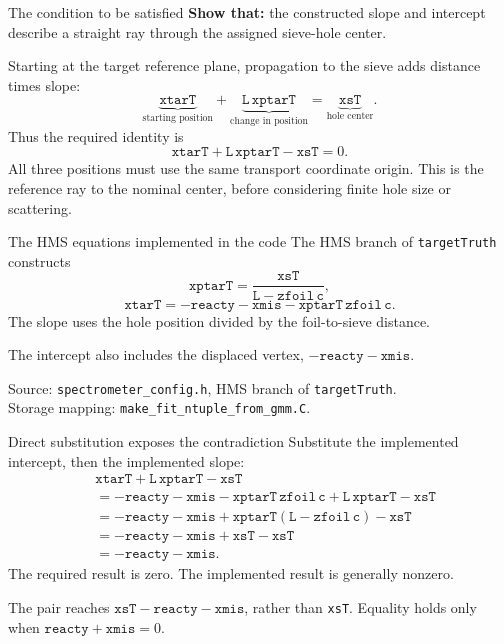 \documentclass[aspectratio=169,11pt]{beamer}
\newcommand{\code}[1]{\texttt{#1}}
\newcommand{\cv}[1]{\mathtt{#1}}
\begin{document}
\begin{frame}{The condition to be satisfied}
\textbf{Show that:} the constructed slope and intercept describe a straight ray through the assigned sieve-hole center.

\vspace{4mm}
Starting at the target reference plane, propagation to the sieve adds distance times slope:
\[
\underbrace{\cv{xtarT}}_{\text{starting position}}
+\underbrace{\cv{L}\,\cv{xptarT}}_{\text{change in position}}
=\underbrace{\cv{xsT}}_{\text{hole center}}.
\]
\vspace{4mm}
Thus the required identity is
\[
\boxed{\cv{xtarT}+\cv{L}\,\cv{xptarT}-\cv{xsT}=0.}
\]
\small
All three positions must use the same transport coordinate origin. This is the reference ray to the nominal center, before considering finite hole size or scattering.
\end{frame}

\begin{frame}{The HMS equations implemented in the code}
The HMS branch of \code{targetTruth} constructs
\[
\cv{xptarT}=\frac{\cv{xsT}}{\cv{L}-\cv{zfoil}\,\cv{c}},
\]
\[
\cv{xtarT}=-\cv{reacty}-\cv{xmis}
-\cv{xptarT}\,\cv{zfoil}\,\cv{c}.
\]
\vspace{3mm}
The slope uses the hole position divided by the foil-to-sieve distance.

\vspace{3mm}
The intercept also includes the displaced vertex, \(-\cv{reacty}-\cv{xmis}\).

\vfill
\scriptsize Source: \code{spectrometer\_config.h}, HMS branch of \code{targetTruth}.\\
Storage mapping: \code{make\_fit\_ntuple\_from\_gmm.C}.
\end{frame}

\begin{frame}{Direct substitution exposes the contradiction}
\small
Substitute the implemented intercept, then the implemented slope:
\begin{align*}
&\cv{xtarT}+\cv{L}\,\cv{xptarT}-\cv{xsT}\\[2mm]
&=-\cv{reacty}-\cv{xmis}
-\cv{xptarT}\,\cv{zfoil}\,\cv{c}
+\cv{L}\,\cv{xptarT}-\cv{xsT}\\[2mm]
&=-\cv{reacty}-\cv{xmis}
+\cv{xptarT}(\cv{L}-\cv{zfoil}\,\cv{c})-\cv{xsT}\\[2mm]
&=-\cv{reacty}-\cv{xmis}+\cv{xsT}-\cv{xsT}\\[2mm]
&=\boxed{-\cv{reacty}-\cv{xmis}.}
\end{align*}
\normalsize
\alert{The required result is zero. The implemented result is generally nonzero.}

\vspace{2mm}
The pair reaches \(\cv{xsT}-\cv{reacty}-\cv{xmis}\), rather than \code{xsT}. Equality holds only when \(\cv{reacty}+\cv{xmis}=0\).
\end{frame}
\end{document}

